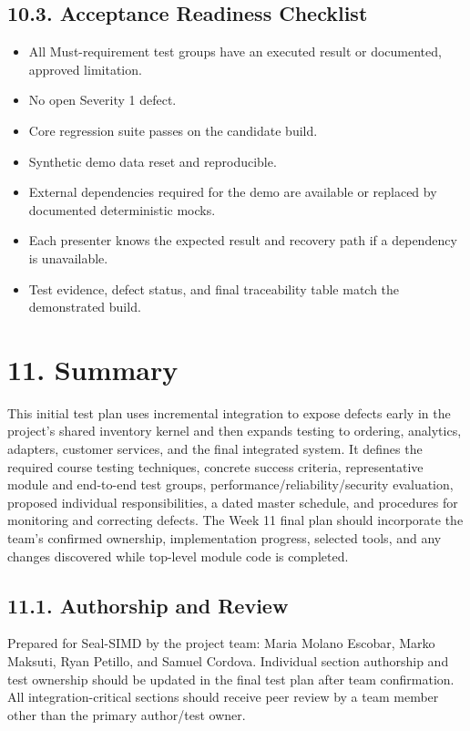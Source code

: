 \subsection{10.3. Acceptance Readiness Checklist}\label{acceptance-readiness-checklist}

\begin{itemize}
\item
  All Must-requirement test groups have an executed result or documented, approved limitation.
\item
  No open Severity 1 defect.
\item
  Core regression suite passes on the candidate build.
\item
  Synthetic demo data reset and reproducible.
\item
  External dependencies required for the demo are available or replaced by documented deterministic mocks.
\item
  Each presenter knows the expected result and recovery path if a dependency is unavailable.
\item
  Test evidence, defect status, and final traceability table match the demonstrated build.
\end{itemize}

\clearpage
\section{11. Summary}\label{summary}

This initial test plan uses incremental integration to expose defects early in the project's shared inventory kernel and then expands testing to ordering, analytics, adapters, customer services, and the final integrated system. It defines the required course testing techniques, concrete success criteria, representative module and end-to-end test groups, performance/reliability/security evaluation, proposed individual responsibilities, a dated master schedule, and procedures for monitoring and correcting defects. The Week 11 final plan should incorporate the team's confirmed ownership, implementation progress, selected tools, and any changes discovered while top-level module code is completed.

\subsection{11.1. Authorship and Review}\label{authorship-and-review}

Prepared for Seal-SIMD by the project team: Maria Molano Escobar, Marko Maksuti, Ryan Petillo, and Samuel Cordova. Individual section authorship and test ownership should be updated in the final test plan after team confirmation. All integration-critical sections should receive peer review by a team member other than the primary author/test owner.

